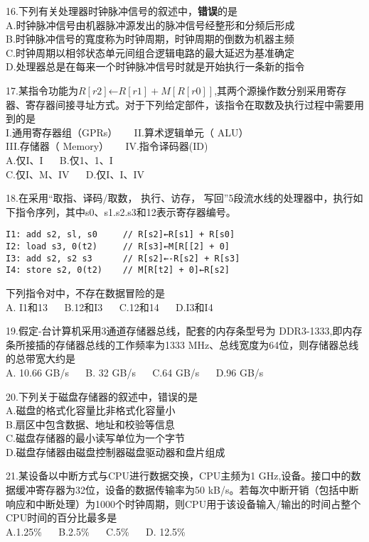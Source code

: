 16.下列有关处理器时钟脉冲信号的叙述中，\textbf{错误}的是 \\
A.时钟脉冲信号由机器脉冲源发出的脉冲信号经整形和分频后形成 \\
B.时钟脉冲信号的寬度称为时钟周期，时钟周期的倒数为机器主频 \\
C.时钟周期以相邻状态单元间组合逻辑电路的最大延迟为基准确定 \\
D.处理器总是在每来一个时钟脉冲信号时就是开始执行一条新的指令

17.某指令功能为$R[r2]$←$R[r1]+M[R[r0]]$,其两个源操作数分别采用寄存器、寄存器间接寻址方式。对于下列给定部件，该指令在取数及执行过程中需要用到的是 \\
I.通用寄存器组（GPRs） $\quad$ II.算术逻辑单元（ ALU） \\
III.存储器（ Memory） $\quad$ IV.指令译码器(ID) \\
A.仅I、I $\quad$ B.仅1、1、I \\
C.仅I、M、IV $\quad$ D.仅I、I、IV

18.在采用“取指、译码/取数， 执行、访存， 写回”5段流水线的处理器中，执行如下指令序列，其中s0、s1.s2.s3和12表示寄存器编号。 \\
\begin{lstlisting}[language=none]
I1: add s2, sl, s0     // R[s2]←R[s1] + R[s0]
I2: load s3, 0(t2)     // R[s3]←M[R[[2] + 0]
I3: add s2, s2 s3      // R[s2]←-R[s2] + R[s3]
I4: store s2, 0(t2)    // M[R[t2] + 0]←R[s2]
\end{lstlisting}
下列指令对中，不存在数据冒险的是 \\
A. I1和13 $\quad$ B.12和I3 $\quad$ C.12和14 $\quad$ D.I3和I4

19.假定-台计算机采用3通道存储器总线，配套的内存条型号为
DDR3-1333,即内存条所接插的存储器总线的工作频率为1333
MHz、总线宽度为64位，则存储器总线的总带宽大约是 \\
A. 10.66 GB/s $\quad$ B. 32 GB/s $\quad$ C.64 GB/s $\quad$ D.96 GB/s

20.下列关于磁盘存储器的叙述中，错误的是 \\
A.磁盘的格式化容量比非格式化容量小 \\
B.扇区中包含数据、地址和校验等信息 \\
C.磁盘存储器的最小读写单位为一个字节 \\
D.磁盘存储器由磁盘控制器磁盘驱动器和盘片组成

21.某设备以中断方式与CPU进行数据交换，CPU主频为1 GHz,设备。接口中的数据缓冲寄存器为32位，设备的数据传输率为50 kB/s。若每次中断开销（包括中断响应和中断处理）为1000个时钟周期，则CPU用于该设备输入/输出的时间占整个CPU时间的百分比最多是 \\
A.1.25\% $\quad$ B.2.5\% $\quad$ C.5\% $\quad$ D. 12.5\%

